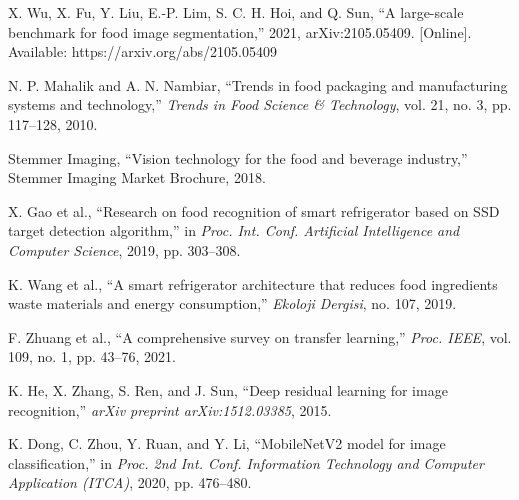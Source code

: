 X. Wu, X. Fu, Y. Liu, E.-P. Lim, S. C. H. Hoi, and Q. Sun, ``A large-scale benchmark for food image segmentation,'' 2021, arXiv:2105.05409. [Online]. Available: https://arxiv.org/abs/2105.05409



N. P. Mahalik and A. N. Nambiar, ``Trends in food packaging and manufacturing systems and technology,'' \textit{Trends in Food Science \& Technology}, vol. 21, no. 3, pp. 117--128, 2010.

Stemmer Imaging, ``Vision technology for the food and beverage industry,'' Stemmer Imaging Market Brochure, 2018.

X. Gao et al., ``Research on food recognition of smart refrigerator based on SSD target detection algorithm,'' in \textit{Proc. Int. Conf. Artificial Intelligence and Computer Science}, 2019, pp. 303--308.

K. Wang et al., ``A smart refrigerator architecture that reduces food ingredients waste materials and energy consumption,'' \textit{Ekoloji Dergisi}, no. 107, 2019.

F. Zhuang et al., ``A comprehensive survey on transfer learning,'' \textit{Proc. IEEE}, vol. 109, no. 1, pp. 43--76, 2021.

K. He, X. Zhang, S. Ren, and J. Sun, ``Deep residual learning for image recognition,'' \textit{arXiv preprint arXiv:1512.03385}, 2015.

K. Dong, C. Zhou, Y. Ruan, and Y. Li, ``MobileNetV2 model for image classification,'' in \textit{Proc. 2nd Int. Conf. Information Technology and Computer Application (ITCA)}, 2020, pp. 476--480.



